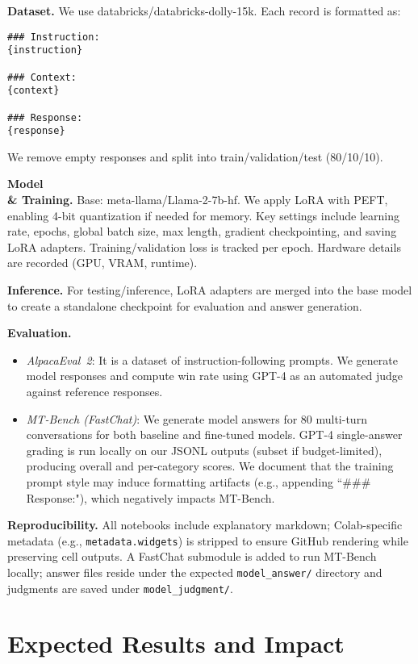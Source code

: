 \documentclass{assignment7_report}
\begin{document}
\textbf{Dataset.} We use databricks/databricks-dolly-15k. Each record is formatted as:
\begin{verbatim}
### Instruction:
{instruction}

### Context:
{context}

### Response:
{response}
\end{verbatim}
We remove empty responses and split into train/validation/test (80/10/10).

\textbf{Model \\& Training.} Base: meta-llama/Llama-2-7b-hf. We apply LoRA with PEFT, enabling 4-bit quantization if needed for memory. Key settings include learning rate, epochs, global batch size, max length, gradient checkpointing, and saving LoRA adapters. Training/validation loss is tracked per epoch. Hardware details are recorded (GPU, VRAM, runtime).

\textbf{Inference.} For testing/inference, LoRA adapters are merged into the base model to create a standalone checkpoint for evaluation and answer generation.

\textbf{Evaluation.} 
\begin{itemize}
  \item \emph{AlpacaEval~2}: It is a dataset of instruction-following prompts. We generate model responses and compute win rate using GPT-4 as an automated judge against reference responses.
  \item \emph{MT-Bench (FastChat)}: We generate model answers for 80 multi-turn conversations for both baseline and fine-tuned models. GPT-4 single-answer grading is run locally on our JSONL outputs (subset if budget-limited), producing overall and per-category scores. We document that the training prompt style may induce formatting artifacts (e.g., appending ``### Response:"), which negatively impacts MT-Bench.
\end{itemize}

\textbf{Reproducibility.} All notebooks include explanatory markdown; Colab-specific metadata (e.g., \texttt{metadata.widgets}) is stripped to ensure GitHub rendering while preserving cell outputs. A FastChat submodule is added to run MT-Bench locally; answer files reside under the expected \texttt{model\_answer/} directory and judgments are saved under \texttt{model\_judgment/}.


\section{Expected Results and Impact}
\vspace*{-3mm}
\end{document}
